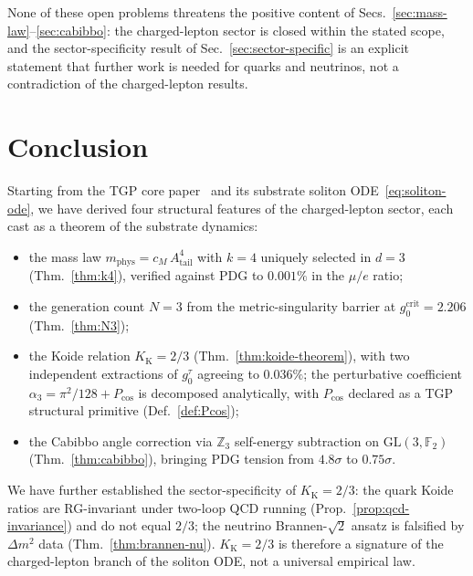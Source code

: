 \documentclass[11pt,a4paper]{article}
\newcommand{\Atail}{A_{\mathrm{tail}}}
\newcommand{\mphys}{m_{\mathrm{phys}}}
\newcommand{\gcrit}{g_{0}^{\mathrm{crit}}}
\newcommand{\Kkoide}{K_{\mathrm{K}}}
\newcommand{\Pcos}{P_{\cos}}
\newcommand{\GLtf}{\mathrm{GL}(3,\mathbb{F}_{2})}
\newcommand{\Zthree}{\mathbb{Z}_{3}}
\begin{document}
None of these open problems threatens the positive content of
Secs.~\ref{sec:mass-law}--\ref{sec:cabibbo}: the charged-lepton sector
is closed within the stated scope, and the sector-specificity result of
Sec.~\ref{sec:sector-specific} is an explicit statement that further
work is needed for quarks and neutrinos, not a contradiction of the
charged-lepton results.

\section{Conclusion}\label{sec:conclusion}

Starting from the TGP core paper~\cite{TGP-core} and its substrate
soliton ODE~\eqref{eq:soliton-ode}, we have derived four structural
features of the charged-lepton sector, each cast as a theorem of the
substrate dynamics:

\begin{itemize}[leftmargin=1.4em,nosep]
\item the mass law $\mphys = c_{M}\,\Atail^{4}$ with $k=4$ uniquely
selected in $d=3$ (Thm.~\ref{thm:k4}), verified against PDG to
$0.001\%$ in the $\mu/e$ ratio;
\item the generation count $N=3$ from the metric-singularity barrier
at $\gcrit=2.206$ (Thm.~\ref{thm:N3});
\item the Koide relation $\Kkoide=2/3$ (Thm.~\ref{thm:koide-theorem}),
with two independent extractions of $g_{0}^{\tau}$ agreeing to
$0.036\%$; the perturbative coefficient
$\alpha_{3}=\pi^{2}/128 + \Pcos$ is decomposed analytically, with
$\Pcos$ declared as a TGP structural primitive
(Def.~\ref{def:Pcos});
\item the Cabibbo angle correction via $\Zthree$ self-energy
subtraction on $\GLtf$ (Thm.~\ref{thm:cabibbo}), bringing PDG tension
from $4.8\sigma$ to $0.75\sigma$.
\end{itemize}

We have further established the sector-specificity of $\Kkoide=2/3$:
the quark Koide ratios are RG-invariant under two-loop QCD running
(Prop.~\ref{prop:qcd-invariance}) and do not equal $2/3$; the neutrino
Brannen-$\sqrt{2}$ ansatz is falsified by $\Delta m^{2}$ data
(Thm.~\ref{thm:brannen-nu}). $\Kkoide=2/3$ is therefore a signature of
the charged-lepton branch of the soliton ODE, not a universal
empirical law.
\end{document}
